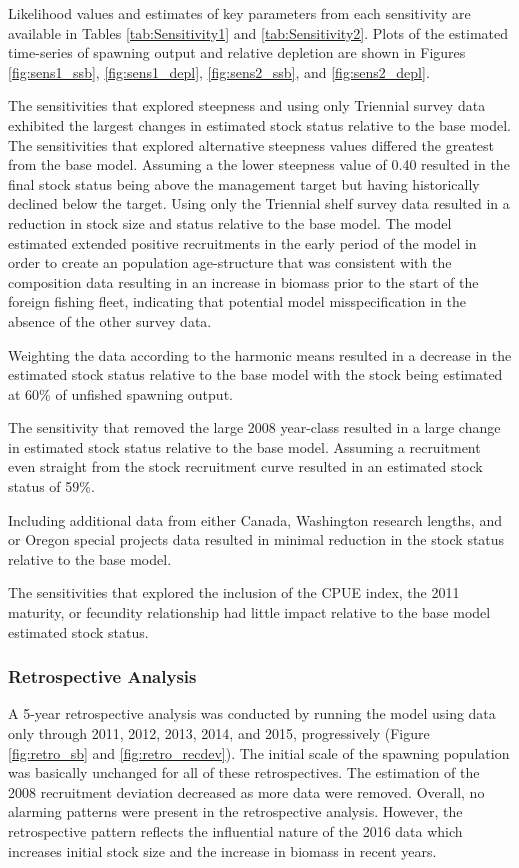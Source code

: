 \documentclass[12pt,]{article}
\begin{document}
Likelihood values and estimates of key parameters from each sensitivity
are available in Tables \ref{tab:Sensitivity1} and
\ref{tab:Sensitivity2}. Plots of the estimated time-series of spawning
output and relative depletion are shown in Figures \ref{fig:sens1_ssb},
\ref{fig:sens1_depl}, \ref{fig:sens2_ssb}, and \ref{fig:sens2_depl}.

The sensitivities that explored steepness and using only Triennial
survey data exhibited the largest changes in estimated stock status
relative to the base model. The sensitivities that explored alternative
steepness values differed the greatest from the base model. Assuming a
the lower steepness value of 0.40 resulted in the final stock status
being above the management target but having historically declined below
the target. Using only the Triennial shelf survey data resulted in a
reduction in stock size and status relative to the base model. The model
estimated extended positive recruitments in the early period of the
model in order to create an population age-structure that was consistent
with the composition data resulting in an increase in biomass prior to
the start of the foreign fishing fleet, indicating that potential model
misspecification in the absence of the other survey data.

Weighting the data according to the harmonic means resulted in a
decrease in the estimated stock status relative to the base model with
the stock being estimated at 60\% of unfished spawning output.

The sensitivity that removed the large 2008 year-class resulted in a
large change in estimated stock status relative to the base model.
Assuming a recruitment even straight from the stock recruitment curve
resulted in an estimated stock status of 59\%.

Including additional data from either Canada, Washington research
lengths, and or Oregon special projects data resulted in minimal
reduction in the stock status relative to the base model.

The sensitivities that explored the inclusion of the CPUE index, the
2011 maturity, or fecundity relationship had little impact relative to
the base model estimated stock status.

\subsubsection{Retrospective Analysis}\label{retrospective-analysis}

A 5-year retrospective analysis was conducted by running the model using
data only through 2011, 2012, 2013, 2014, and 2015, progressively
(Figure \ref{fig:retro_sb} and \ref{fig:retro_recdev}). The initial
scale of the spawning population was basically unchanged for all of
these retrospectives. The estimation of the 2008 recruitment deviation
decreased as more data were removed. Overall, no alarming patterns were
present in the retrospective analysis. However, the retrospective
pattern reflects the influential nature of the 2016 data which increases
initial stock size and the increase in biomass in recent years.
\end{document}
